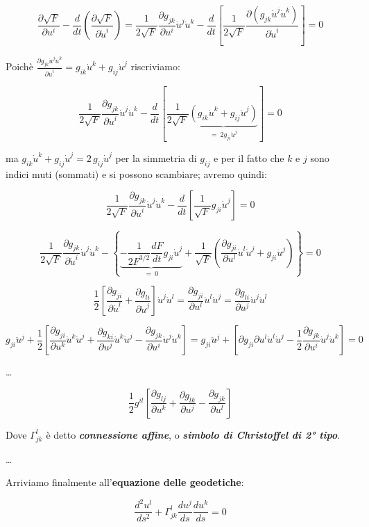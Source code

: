 $$
\dfrac{\partial \sqrt F}{\partial u^i}
- 
\dfrac d{dt} \left( \dfrac{\partial \sqrt F}{\partial \dot u^i} \right) 
= 
\dfrac 1 {2\sqrt F} \dfrac{\partial g_{jk}}{\partial u^i} \dot u^j \dot u^k 
- 
\dfrac d{dt} \left[ \dfrac 1 {2\sqrt F} \dfrac{\partial (g_{jk} \dot u^j \dot u^k)}{\partial \dot u^i} \right]
= 0
$$

Poichè 
$
\tfrac {\partial g_{jk} \dot u^j \dot u^k}{\partial \dot u^i} = g_{ik} \dot u^k + g_{ij} \dot u^j
$
riscriviamo:

$$
\dfrac{1}{2\sqrt F} \dfrac{\partial g_{jk}}{\partial \dot u^i} \dot u^j \dot u^k - \dfrac{d}{dt} \left[ \dfrac{1}{2\sqrt F} \underbrace{(g_{ik} \dot u^k + g_{ij} \dot u^j)}_{=\ 2g_{ji}\dot u^j} \right] = 0
$$

ma $g_{ik}\dot{u}^k + g_{ij}\dot{u}^j = 2\,g_{ij}\dot{u}^j$ per la simmetria di $g_{ij}$ e per il fatto che $k$ e $j$ sono indici muti (sommati) e si possono scambiare; avremo quindi:

$$
\dfrac 1{2\sqrt F} \dfrac{\partial g_{jk}}{\partial \dot u^i} \dot u^j \dot u^k - \dfrac d{dt} \left[ \dfrac 1 {\sqrt F} g_{ji} \dot u^j \right] = 0
$$

$$
\dfrac 1{2\sqrt F} \dfrac{\partial g_{jk}}{\partial \dot u^i} \dot u^j \dot u^k
-
\left\{
\underbrace{
- \dfrac 1{2 F^{3/2}} \dfrac {dF}{dt} g_{ji} \dot u^j 
}_{= \ 0}
+ \dfrac 1{\sqrt F}
\left(
    \dfrac{\partial g_{ji}}{\partial u^l } \dot u^l \dot u^j + g_{ji} \ddot u^j
\right)
\right\}
= 0
$$

$$
\dfrac 12 
\left[
    \dfrac{\partial g_{ji}}{\partial \dot u^l} + \dfrac{\partial g_{li}}{\partial \dot u^j}
\right]
\dot u^j \dot u^l
=
\dfrac {\partial g_{ji}}{\partial u^l} \dot u^l \dot u^j
=
\dfrac {\partial g_{li}}{\partial u^j} \dot u^j \dot u^l
$$

$$
g_{ji} \ddot u^j + \dfrac 12
\left[
    \dfrac{\partial g_{ji}}{\partial u^k} \dot u^k \dot u^j
    +
    \dfrac{\partial g_{ki}}{\partial u^j} \dot u^k \dot u^j
    -
    \dfrac{\partial g_{jk}}{\partial u^i} \dot u^j \dot u^k
\right]
=
g_{ji} \ddot u^j +
\left[
    \partial{g_{ji}}{\partial u^l} \dot u^l \dot u^j - \dfrac 12 \dfrac{\partial g_{jk}}{\partial u^i} \dot u^j \dot u^k
\right] 
= 0
$$

\dots

$$
\dfrac 12 g^{il} \left[ \dfrac{\partial g_{lj}}{\partial u^k} + \dfrac{\partial g_{lk}}{\partial u^j} - \dfrac{\partial g_{jk}}{\partial u^l} \right]
$$

Dove $\Gamma^l_{jk}$ è detto \textbf{\textit{connessione affine}}, o \textbf{\textit{simbolo di Christoffel di 2° tipo}}.

\dots

Arriviamo finalmente all'\textbf{equazione delle geodetiche}:

$$
\boxed{
\dfrac{d^2u^l}{ds^2} + \Gamma^l_{jk} \dfrac{du^j}{ds} \dfrac{du^k}{ds} = 0
}
$$